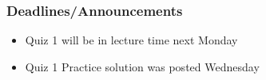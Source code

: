
\begin{frame}
    \frametitle{Deadlines/Announcements}
\begin{itemize}
            \item Quiz 1 will be in lecture time next Monday
            \item Quiz 1 Practice solution was posted Wednesday
        \end{itemize}
\end{frame}
